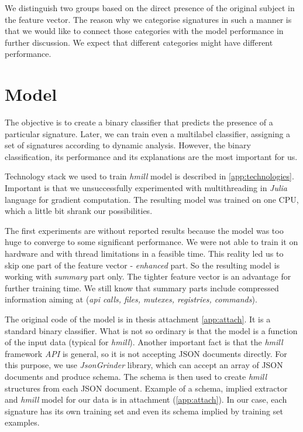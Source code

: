 We distinguish two groups based on the direct presence of the original subject in the feature vector. The reason why we categorise signatures in such a manner is that we would like to connect those categories with the model performance in further discussion. We expect that different categories might have different performance.

\section{Model}
The objective is to create a binary classifier that predicts the presence of a particular signature. Later, we can train even a multilabel classifier, assigning a set of signatures according to dynamic analysis. However, the binary classification, its performance and its explanations are the most important for us. 


Technology stack we used to train \emph{hmill} model is described in \ref{app:technologies}. Important is that we unsuccessfully experimented with multithreading in \emph{Julia} language for gradient computation. The resulting model was trained on one CPU, which a little bit shrank our possibilities.

The first experiments are without reported results because the model was too huge to converge to some significant performance. We were not able to train it on hardware and with thread limitations in a feasible time. This reality led us to skip one part of the feature vector - \emph{enhanced} part. So the resulting model is working with \emph{summary} part only. The tighter feature vector is an advantage for further training time. We still know that summary parts include compressed information aiming at (\emph{api calls, files, mutexes, registries, commands}).

The original code of the model is in thesis attachment \ref{app:attach}. It is a standard binary classifier. What is not so ordinary is that the model is a function of the input data (typical for \emph{hmill}). Another important fact is that the \emph{hmill} framework \emph{API} is general, so it is not accepting JSON documents directly. For this purpose, we use \emph{JsonGrinder} library, which can accept an array of JSON documents and produce schema. The schema is then used to create \emph{hmill} structures from each JSON document. Example of a schema, implied extractor and \emph{hmill} model for our data is in attachment (\ref{app:attach}). In our case, each signature has its own training set and even its schema implied by training set examples.

